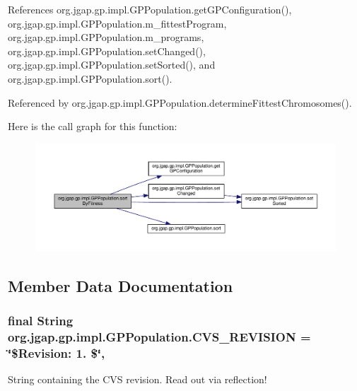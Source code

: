 References org.\-jgap.\-gp.\-impl.\-G\-P\-Population.\-get\-G\-P\-Configuration(), org.\-jgap.\-gp.\-impl.\-G\-P\-Population.\-m\-\_\-fittest\-Program, org.\-jgap.\-gp.\-impl.\-G\-P\-Population.\-m\-\_\-programs, org.\-jgap.\-gp.\-impl.\-G\-P\-Population.\-set\-Changed(), org.\-jgap.\-gp.\-impl.\-G\-P\-Population.\-set\-Sorted(), and org.\-jgap.\-gp.\-impl.\-G\-P\-Population.\-sort().



Referenced by org.\-jgap.\-gp.\-impl.\-G\-P\-Population.\-determine\-Fittest\-Chromosomes().



Here is the call graph for this function\-:
\nopagebreak
\begin{figure}[H]
\begin{center}
\leavevmode
\includegraphics[width=350pt]{classorg_1_1jgap_1_1gp_1_1impl_1_1_g_p_population_a0d7b58819ffefbefbc0baaa1d12a9cb6_cgraph}
\end{center}
\end{figure}




\subsection{Member Data Documentation}
\hypertarget{classorg_1_1jgap_1_1gp_1_1impl_1_1_g_p_population_ab209b6a7ffefa14c8d2f133e34f4d7e5}{
\subsubsection[{C\-V\-S\-\_\-\-R\-E\-V\-I\-S\-I\-O\-N}]{\setlength{\rightskip}{0pt plus 5cm}final String org.\-jgap.\-gp.\-impl.\-G\-P\-Population.\-C\-V\-S\-\_\-\-R\-E\-V\-I\-S\-I\-O\-N = \char`\"{}\$Revision\-: 1. \$\char`\"{}\hspace{0.3cm}{\ttfamily [static]}, {\ttfamily [private]}}}\label{classorg_1_1jgap_1_1gp_1_1impl_1_1_g_p_population_ab209b6a7ffefa14c8d2f133e34f4d7e5}
String containing the C\-V\-S revision. Read out via reflection! 

